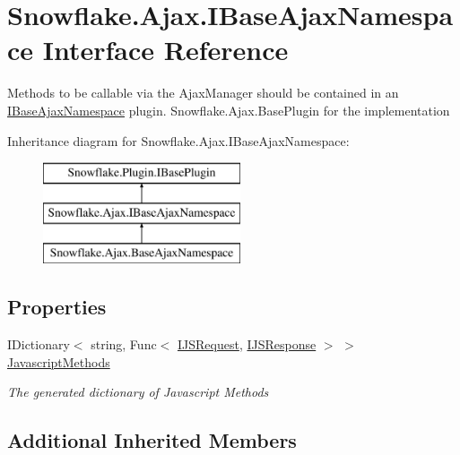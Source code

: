 \hypertarget{interface_snowflake_1_1_ajax_1_1_i_base_ajax_namespace}{}\section{Snowflake.\+Ajax.\+I\+Base\+Ajax\+Namespace Interface Reference}
\label{interface_snowflake_1_1_ajax_1_1_i_base_ajax_namespace}


Methods to be callable via the Ajax\+Manager should be contained in an \hyperlink{interface_snowflake_1_1_ajax_1_1_i_base_ajax_namespace}{I\+Base\+Ajax\+Namespace} plugin. Snowflake.\+Ajax.\+Base\+Plugin for the implementation  


Inheritance diagram for Snowflake.\+Ajax.\+I\+Base\+Ajax\+Namespace\+:\begin{figure}[H]
\begin{center}
\leavevmode
\includegraphics[height=3.000000cm]{interface_snowflake_1_1_ajax_1_1_i_base_ajax_namespace}
\end{center}
\end{figure}
\subsection*{Properties}
\begin{DoxyCompactItemize}
\item 
I\+Dictionary$<$ string, Func$<$ \hyperlink{interface_snowflake_1_1_ajax_1_1_i_j_s_request}{I\+J\+S\+Request}, \hyperlink{interface_snowflake_1_1_ajax_1_1_i_j_s_response}{I\+J\+S\+Response} $>$ $>$ \hyperlink{interface_snowflake_1_1_ajax_1_1_i_base_ajax_namespace_a2b4acf2a85e2c08b0037604021670df0}{Javascript\+Methods}
\begin{DoxyCompactList}\small\item\em The generated dictionary of Javascript Methods \end{DoxyCompactList}\end{DoxyCompactItemize}
\subsection*{Additional Inherited Members}


